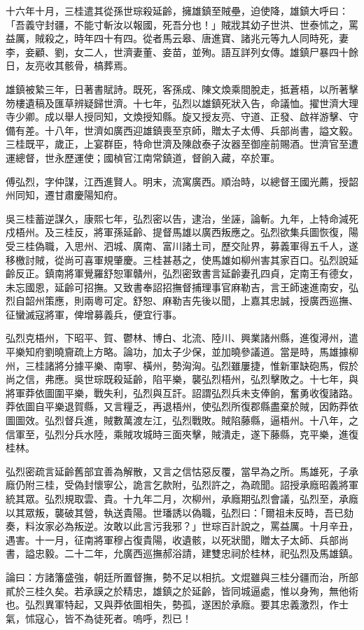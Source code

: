\begin{pinyinscope}
十六年十月，三桂遣其從孫世琮殺延齡，擁雄鎮至賊壘，迫使降，雄鎮大呼曰：「吾義守封疆，不能寸斬汝以報國，死吾分也！」賊戕其幼子世洪、世泰怵之，罵益厲，賊殺之，時年四十有四。從者馬云皋、唐進寶、諸兆元等九人同時死，妻李，妾顧、劉，女二人，世濟妻董、妾苗，並殉。語互詳列女傳。雄鎮尸暴四十餘日，友亮收其骸骨，槁葬焉。

雄鎮被縶三年，日著書賦詩。既死，客孫成、陳文煥乘間脫走，抵蒼梧，以所著擊笏樓遺稿及匯草辨疑歸世濟。十七年，弘烈以雄鎮死狀入告，命議恤。擢世濟大理寺少卿。成以舉人授同知，文煥授知縣。旋又授友亮、守道、正發、啟祥游擊、守備有差。十八年，世濟如廣西迎雄鎮喪至京師，贈太子太傅、兵部尚書，謚文毅。三桂既平，歲正，上宴群臣，特命世濟及陳啟泰子汝器至御座前賜酒。世濟官至遭運總督，世永歷運使；國楨官江南常鎮道，督餉入藏，卒於軍。

傅弘烈，字仲謀，江西進賢人。明末，流寓廣西。順治時，以總督王國光薦，授韶州同知，遷甘肅慶陽知府。

吳三桂蓄逆謀久，康熙七年，弘烈密以告，逮治，坐誣，論斬。九年，上特命減死戍梧州。及三桂反，將軍孫延齡、提督馬雄以廣西叛應之。弘烈欲集兵圖恢復，陽受三桂偽職，入思州、泗城、廣南、富川諸土司，歷交阯界，募義軍得五千人，遂移檄討賊，從尚可喜軍規肇慶。三桂甚惎之，使馬雄如柳州害其家百口。弘烈說延齡反正。鎮南將軍覺羅舒恕軍贛州，弘烈密致書言延齡妻孔四貞，定南王有德女，未忘國恩，延齡可招撫。又致書奉詔招撫督捕理事官麻勒吉，言王師速進南安，弘烈自韶州策應，則兩粵可定。舒恕、麻勒吉先後以聞，上嘉其忠誠，授廣西巡撫、征蠻滅寇將軍，俾增募義兵，便宜行事。

弘烈克梧州，下昭平、賀、鬱林、博白、北流、陸川、興業諸州縣，進復潯州，遣平樂知府劉曉齎疏上方略。論功，加太子少保，並加曉參議道。當是時，馬雄據柳州，三桂諸將分據平樂、南寧、橫州，勢洶洶。弘烈雖屢捷，惟新軍缺砲馬，假於尚之信，弗應。吳世琮既殺延齡，陷平樂，襲弘烈梧州，弘烈擊敗之。十七年，與將軍莽依圖圍平樂，戰失利，弘烈與互訐。詔謂弘烈兵未支俸餉，奮勇收復諸路。莽依圖自平樂退賀縣，又言糧乏，再退梧州，使弘烈所復郡縣盡棄於賊，因飭莽依圖圖效。弘烈督兵進，賊數萬渡左江，弘烈戰敗。賊陷藤縣，逼梧州。十八年，之信軍至，弘烈分兵水陸，乘賊攻城時三面夾擊，賊潰走，遂下藤縣，克平樂，進復桂林。

弘烈密疏言延齡舊部宜善為解散，又言之信怙惡反覆，當早為之所。馬雄死，子承廕仍附三桂，受偽封懷寧公，詭言乞款附，弘烈許之，為疏聞。詔授承廕昭義將軍統其眾。弘烈規取雲、貴。十九年二月，次柳州，承廕期弘烈會議，弘烈至，承廕以其眾叛，襲破其營，執送貴陽。世璠誘以偽職，弘烈曰：「爾祖未反時，吾已劾奏，料汝家必為叛逆。汝敢以此言污我邪？」世琮百計說之，罵益厲。十月辛丑，遇害。十一月，征南將軍穆占復貴陽，收遺骸，以死狀聞，贈太子太師、兵部尚書，謚忠毅。二十二年，允廣西巡撫郝浴請，建雙忠祠於桂林，祀弘烈及馬雄鎮。

論曰：方諸籓盛強，朝廷所置督撫，勢不足以相抗。文焜雖與三桂分疆而治，所部貳於三桂久矣。若承謨之於精忠，雄鎮之於延齡，皆同城逼處，惟以身殉，無他術也。弘烈異軍特起，又與莽依圖相失，勢孤，遂困於承廕。要其忠義激烈，作士氣，怵寇心，皆不為徒死者。嗚呼，烈已！


\end{pinyinscope}
